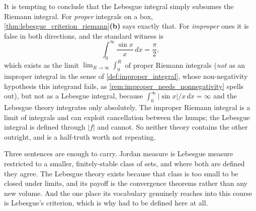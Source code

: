 \begin{ainote}
It is tempting to conclude that the Lebesgue integral simply subsumes the Riemann integral. For
\emph{proper} integrals on a box, \cref{thm:lebesgue_criterion_riemann}\textbf{(b)} says exactly
that. For \emph{improper} ones it is false in both directions, and the standard witness is
\[\int_0^\infty \frac{\sin x}{x}\,dx = \frac{\pi}{2},\]
which exists as the limit $\lim_{R\to\infty}\int_0^R$ of proper Riemann integrals (\emph{not}
as an improper integral in the sense of \cref{def:improper_integral}, whose non-negativity
hypothesis this integrand fails, as \cref{rem:improper_needs_nonnegativity} spells out), but
not as a Lebesgue
integral, because $\int_0^\infty \lvert \sin x\rvert/x \,dx = \infty$ and the Lebesgue theory
integrates only absolutely. The improper Riemann integral is a limit of integrals and can exploit
cancellation between the humps; the Lebesgue integral is defined through $\lvert f\rvert$ and
cannot. So neither theory contains the other outright, and  is a
half-truth worth not repeating.
\end{ainote}

\begin{remark}
\label{rem:lebesgue_digression_summary}
Three sentences are enough to carry. Jordan measure is Lebesgue measure restricted to a smaller,
finitely-stable class of sets, and where both are defined they agree. The Lebesgue theory exists
because that class is too small to be closed under limits, and its payoff is the convergence
theorems rather than any new volume. And the one place its vocabulary genuinely reaches into this
course is Lebesgue's criterion, which is why  had to be defined here at all.
\end{remark}

